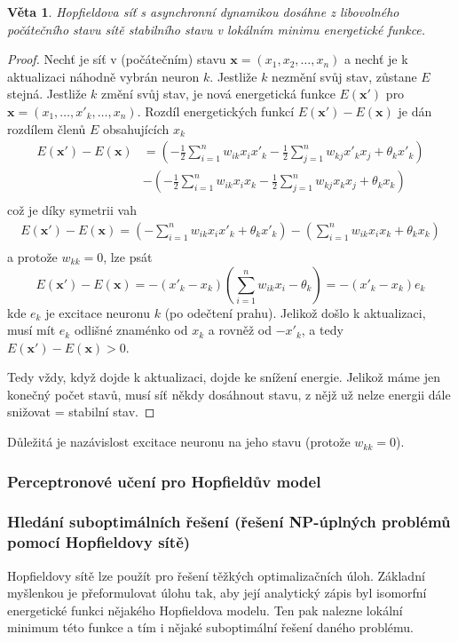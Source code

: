 \documentclass[11pt]{report} %
\renewcommand{\vec}[1]{\mathbf{#1}}
\newtheorem{theorem}{Věta}[section]
\numberwithin{equation}{section}
\begin{document}
\begin{theorem}
Hopfieldova síť s asynchronní dynamikou dosáhne z libovolného počátečního stavu sítě stabilního stavu v lokálním minimu energetické funkce.
\end{theorem}
\begin{proof}
Nechť je síť v (počátečním) stavu $\vec{x} = (x_1,x_2,\dots,x_n)$ a nechť je k aktualizaci náhodně vybrán neuron $k$. Jestliže $k$ nezmění svůj stav, zůstane $E$ stejná. Jestliže $k$ změní svůj stav, je nová energetická funkce $E(\vec{x'})$ pro $\vec{x} = (x_1,\dots,x'_k, \dots,x_n)$. Rozdíl energetických funkcí
$E(\vec{x'}) - E(\vec{x})$ je dán rozdílem členů $E$ obsahujících $x_k$
\begin{align*}
E(\vec{x'}) - E(\vec{x}) &= 
\left(- \frac{1}{2}\sum\limits_{i=1}^{n} w_{ik} x_i x'_k 
- \frac{1}{2}\sum\limits_{j=1}^{n} w_{kj} x'_k x_j 
+ \theta_k x'_k\right)\\
&- \left(- \frac{1}{2}\sum\limits_{i=1}^{n} w_{ik} x_i x_k
- \frac{1}{2}\sum\limits_{j=1}^{n} w_{kj} x_k x_j
+ \theta_k x_k\right)\\
\end{align*}
což je díky symetrii vah
\begin{align*}
E(\vec{x'}) - E(\vec{x}) = 
\left(-\sum\limits_{i=1}^{n} w_{ik} x_i x'_k 
+ \theta_k x'_k\right) 
- \left(\sum\limits_{i=1}^{n} w_{ik} x_i x_k
+ \theta_k x_k\right)\\
\end{align*}
a protože $w_{kk} = 0$, lze psát
$$E(\vec{x'}) - E(\vec{x}) = 
-(x'_k - x_k)\left(\sum\limits_{i=1}^{n} w_{ik} x_i - \theta_k\right) = -(x'_k - x_k)e_k
$$
kde $e_k$ je excitace neuronu $k$ (po odečtení prahu). Jelikož došlo k aktualizaci, musí mít $e_k$ odlišné znaménko od $x_k$ a rovněž od $-x'_k$, a tedy $E(\vec{x'}) - E(\vec{x}) > 0$. 

Tedy vždy, když dojde k aktualizaci, dojde ke snížení energie. Jelikož máme jen konečný počet stavů, musí síť někdy dosáhnout stavu, z nějž už nelze energii dále snižovat = stabilní stav.
\end{proof}

Důležitá je nazávislost excitace neuronu na jeho stavu (protože $w_{kk} = 0$).

\subsubsection{Perceptronové učení pro Hopfieldův model}


\subsubsection{Hledání suboptimálních řešení (řešení NP-úplných problémů pomocí Hopfieldovy sítě)}
Hopfieldovy sítě lze použít pro řešení těžkých optimalizačních úloh. Základní myšlenkou je přeformulovat úlohu tak, aby její analytický zápis byl isomorfní energetické funkci nějakého Hopfieldova modelu. Ten pak nalezne lokální minimum této funkce a tím i nějaké suboptimální řešení daného problému.
\end{document}
